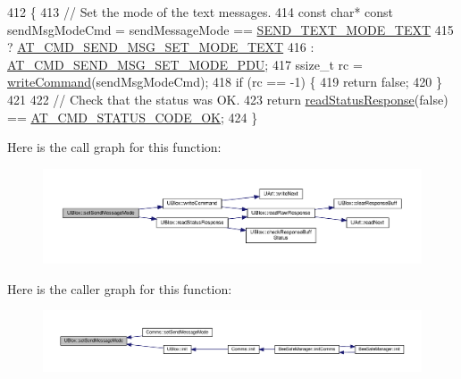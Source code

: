 \begin{DoxyCode}
412 \{
413     \textcolor{comment}{// Set the mode of the text messages.}
414     \textcolor{keyword}{const} \textcolor{keywordtype}{char}* \textcolor{keyword}{const} sendMsgModeCmd = sendMessageMode == \hyperlink{_u_blox_8h_a4fdc1adf2ea333d6490119160a35401a}{SEND\_TEXT\_MODE\_TEXT}
415                                    ? \hyperlink{_u_blox_8cpp_aeb1209bd42562b052073f701f1f83487}{AT\_CMD\_SEND\_MSG\_SET\_MODE\_TEXT}
416                                    : \hyperlink{_u_blox_8cpp_a74e9299c0c9318c9b901d5283a1644f4}{AT\_CMD\_SEND\_MSG\_SET\_MODE\_PDU};
417     ssize\_t rc = \hyperlink{class_u_blox_af604d1897a66192bf1c2a11997f2634d}{writeCommand}(sendMsgModeCmd);
418     \textcolor{keywordflow}{if} (rc == -1) \{
419         \textcolor{keywordflow}{return} \textcolor{keyword}{false};
420     \}
421 
422     \textcolor{comment}{// Check that the status was OK.}
423     \textcolor{keywordflow}{return} \hyperlink{class_u_blox_a4eaca5b1b1c4b5b6f6164b220dd43e0b}{readStatusResponse}(\textcolor{keyword}{false}) == \hyperlink{_u_blox_8cpp_a6ebc1682eb6b9964fccb4a61688ff307}{AT\_CMD\_STATUS\_CODE\_OK};
424 \}
\end{DoxyCode}
Here is the call graph for this function\+:\nopagebreak
\begin{figure}[H]
\begin{center}
\leavevmode
\includegraphics[width=350pt]{da/df6/class_u_blox_a12c1042d3bcb503b025927fd53d54243_cgraph}
\end{center}
\end{figure}
Here is the caller graph for this function\+:\nopagebreak
\begin{figure}[H]
\begin{center}
\leavevmode
\includegraphics[width=350pt]{da/df6/class_u_blox_a12c1042d3bcb503b025927fd53d54243_icgraph}
\end{center}
\end{figure}
\mbox{\label{class_u_blox_a2e816e864ebf43743b3f6187e20c2b1f}} 
